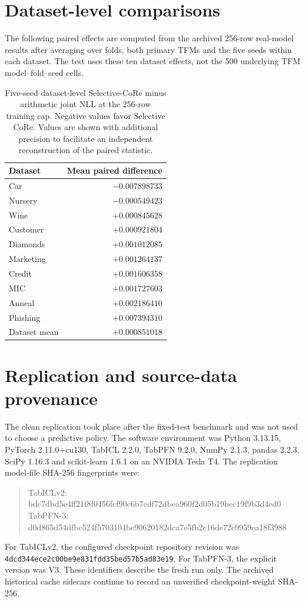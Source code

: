 \documentclass[a4paper,fleqn]{cas-sc}
\begin{document}
\section{Dataset-level comparisons}
The following paired effects are computed from the archived 256-row real-model results after averaging over folds, both primary TFMs and the five seeds within each dataset. The test uses these ten dataset effects, not the 500 underlying TFM model--fold--seed cells.
\begin{table}
\centering
\caption{Five-seed dataset-level Selective-CoRe minus arithmetic joint NLL at the 256-row training cap. Negative values favor Selective CoRe. Values are shown with additional precision to facilitate an independent reconstruction of the paired statistic.}
\label{tab:datasetprimary}
\begin{tabular}{lr}
\toprule
Dataset & Mean paired difference\\
\midrule
Car & $-0.007898733$\\
Nursery & $-0.000549423$\\
Wine & $+0.000845628$\\
Customer & $+0.000921804$\\
Diamonds & $+0.001012085$\\
Marketing & $+0.001264137$\\
Credit & $+0.001606358$\\
MIC & $+0.001727603$\\
Anneal & $+0.002186410$\\
Phishing & $+0.007394310$\\
\midrule
Dataset mean & $+0.000851018$\\
\bottomrule
\end{tabular}
\end{table}

\section{Replication and source-data provenance}
The clean replication took place after the fixed-test benchmark and was not used to choose a predictive policy. The software environment was Python 3.13.15, PyTorch 2.11.0+cu130, TabICL 2.2.0, TabPFN 9.2.0, NumPy 2.1.3, pandas 2.2.3, SciPy 1.16.3 and scikit-learn 1.6.1 on an NVIDIA Tesla T4. The replication model-file SHA-256 fingerprints were:
\begin{quote}\small\ttfamily
TabICLv2: bdc7dbd5e4ff21f8f0456fcf90c6b7cdf72dbea960f2d05b19bec19f9b3d4ed0\\
TabPFN-3: d0d865d54dfbc524f5703104be90620182dca7e5fb2c16de72e9959ea18f3988
\end{quote}
For TabICLv2, the configured checkpoint repository revision was \texttt{4dcd344ece2c00be9e831fdd35bed57b5ad83e19}. For TabPFN-3, the explicit version was V3. These identifiers describe the fresh run only. The archived historical cache sidecars continue to record an unverified checkpoint-weight SHA-256.
\end{document}
